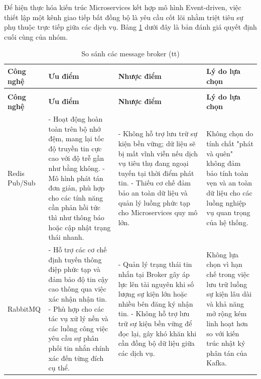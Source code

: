 Để hiện thực hóa kiến trúc Microservices kết hợp mô hình Event-driven, việc thiết lập một kênh giao tiếp bất đồng bộ là yêu cầu cốt lõi nhằm triệt tiêu sự phụ thuộc trực tiếp giữa các dịch vụ. Bảng \ref{tab:backend_message_broker} dưới đây là bản đánh giá quyết định cuối cùng của nhóm.

\begin{center}
\begin{longtable}{|p{2.5cm}|p{4cm}|p{4cm}|p{3.5cm}|}
\caption{So sánh các message broker} \label{tab:backend_message_broker} \\
\hline
\centering\textbf{Công nghệ} & \centering\textbf{Ưu điểm} & \centering\textbf{Nhược điểm} & \centering\arraybackslash\textbf{Lý do lựa chọn} \\ \hline
\endfirsthead

\caption[]{So sánh các message broker (tt)} \\
\hline
\centering\textbf{Công nghệ} & \centering\textbf{Ưu điểm} & \centering\textbf{Nhược điểm} & \centering\arraybackslash\textbf{Lý do lựa chọn} \\ \hline
\endhead


Redis Pub/Sub & 
- Hoạt động hoàn toàn trên bộ nhớ đệm, mang lại tốc độ truyền tin cực cao với độ trễ gần như bằng không. \newline 
- Mô hình phát tán đơn giản, phù hợp cho các tính năng cần phản hồi tức thì như thông báo hoặc cập nhật trạng thái nhanh. & 
- Không hỗ trợ lưu trữ sự kiện bền vững; dữ liệu sẽ bị mất vĩnh viễn nếu dịch vụ tiêu thụ đang ngoại tuyến tại thời điểm phát tin. \newline 
- Thiếu cơ chế đảm bảo an toàn dữ liệu và quản lý luồng phức tạp cho Microservices quy mô lớn. & 
Không chọn do tính chất "phát và quên" không đảm bảo tính toàn vẹn và an toàn dữ liệu cho các luồng nghiệp vụ quan trọng của hệ thống. \\ \hline

RabbitMQ & 
- Hỗ trợ các cơ chế định tuyến thông điệp phức tạp và đảm bảo độ tin cậy cao thông qua việc xác nhận nhận tin. \newline 
- Phù hợp cho các tác vụ xử lý nền và các luồng công việc yêu cầu sự phân phối tin nhắn chính xác đến từng đích cụ thể. & 
- Quản lý trạng thái tin nhắn tại Broker gây áp lực lên tài nguyên khi số lượng sự kiện lớn hoặc nhiều bên đăng ký nhận tin. \newline 
- Không hỗ trợ lưu trữ sự kiện bền vững để đọc lại, gây khó khăn khi cần đồng bộ dữ liệu giữa các dịch vụ. & 
Không lựa chọn vì hạn chế trong việc lưu trữ luồng sự kiện lâu dài và khả năng mở rộng kém linh hoạt hơn so với kiến trúc nhật ký phân tán của Kafka. \\ \hline


\end{longtable}
\end{center}
